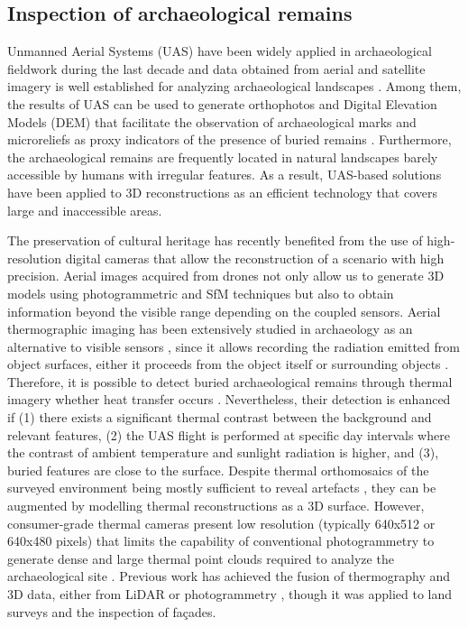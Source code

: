 \subsection{Inspection of archaeological remains}

Unmanned Aerial Systems (UAS) have been widely applied in archaeological fieldwork during the last decade \cite{campana_drones_2017} and data obtained from aerial and satellite imagery is well established for analyzing archaeological landscapes \cite{waagen_new_2019}. Among them, the results of UAS can be used to generate orthophotos and Digital Elevation Models (DEM) that facilitate the observation of archaeological marks and microreliefs as proxy indicators of the presence of buried remains \cite{pecci_archaeology_2016, dubbini_digital_2016}. Furthermore, the archaeological remains are frequently located in natural landscapes barely accessible by humans with irregular features. As a result, UAS-based solutions have been applied to 3D reconstructions as an efficient technology that covers large and inaccessible areas. 

The preservation of cultural heritage has recently benefited from the use of high-resolution digital cameras that allow the reconstruction of a scenario with high precision. Aerial images acquired from drones not only allow us to generate 3D models using photogrammetric and SfM techniques but also to obtain information beyond the visible range depending on the coupled sensors. Aerial thermographic imaging has been extensively studied in archaeology as an alternative to visible sensors \cite{casana_archaeological_2017, brooke_thermal_2018, mcleester_detecting_2018, salgado_carmona_assessing_2020}, since it allows recording the radiation emitted from object surfaces, either it proceeds from the object itself or surrounding objects \cite{vollmer_infrared_2017}. Therefore, it is possible to detect buried archaeological remains through thermal imagery whether heat transfer occurs \cite{casana_archaeological_2017}. Nevertheless, their detection is enhanced if (1) there exists a significant thermal contrast between the background and relevant features, (2) the UAS flight is performed at specific day intervals where the contrast of ambient temperature and sunlight radiation is higher, and (3), buried features are close to the surface. Despite thermal orthomosaics of the surveyed environment being mostly sufficient to reveal artefacts \cite{mcleester_detecting_2018, salgado_carmona_assessing_2020}, they can be augmented by modelling thermal reconstructions as a 3D surface. However, consumer-grade thermal cameras present low resolution (typically 640x512 or 640x480 pixels) that limits the capability of conventional photogrammetry to generate dense and large thermal point clouds required to analyze the archaeological site \cite{javadnejad_photogrammetric_2020}. Previous work has achieved the fusion of thermography and 3D data, either from LiDAR or photogrammetry \cite{patrucco_3d_2022}, though it was applied to land surveys and the inspection of façades.

